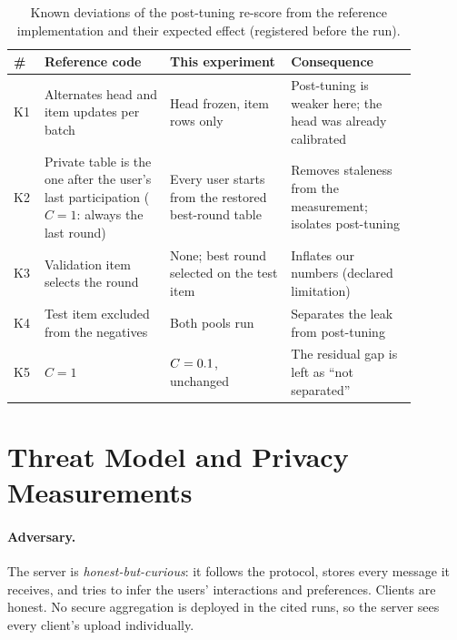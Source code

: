 \begin{table}[htbp]
  \caption{Known deviations of the post-tuning re-score from the reference implementation and
  their expected effect (registered before the run).}
  \label{tab:posttune-deviations}
  \centering\small
  \begin{tabular}{p{0.04\linewidth}>{\raggedright\arraybackslash}p{0.28\linewidth}
                  >{\raggedright\arraybackslash}p{0.27\linewidth}>{\raggedright\arraybackslash}p{0.29\linewidth}}
    \toprule
    \# & Reference code & This experiment & Consequence \\
    \midrule
    K1 & Alternates head and item updates per batch & Head frozen, item rows only & Post-tuning is weaker here; the head was already calibrated \\
    K2 & Private table is the one after the user's last participation ($C=1$: always the last round) & Every user starts from the restored best-round table & Removes staleness from the measurement; isolates post-tuning \\
    K3 & Validation item selects the round & None; best round selected on the test item & Inflates our numbers (declared limitation) \\
    K4 & Test item excluded from the negatives & Both pools run & Separates the leak from post-tuning \\
    K5 & $C=1$ & $C=0.1$, unchanged & The residual gap is left as ``not separated'' \\
    \bottomrule
  \end{tabular}
\end{table}

\section{Threat Model and Privacy Measurements}
\label{sec:method-threat}

\paragraph{Adversary.} The server is \emph{honest-but-curious}: it follows the protocol, stores
every message it receives, and tries to infer the users' interactions and preferences. Clients
are honest. No secure aggregation is deployed in the cited runs, so the server sees every
client's upload individually.


